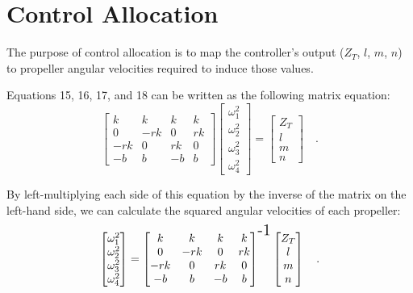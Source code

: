 \section*{Control Allocation}

The purpose of control allocation is to map the controller's output ($Z_T$, $l$, $m$, $n$) to propeller angular velocities required to induce those values.

Equations 15, 16, 17, and 18 can be written as the following matrix equation:
\begin{equation*}
    \begin{bmatrix}
        k & k & k & k \\ 
        0 & -rk & 0 & rk \\ 
        -rk & 0 & rk & 0 \\ 
        -b & b & -b & b
    \end{bmatrix}
    \begin{bmatrix}
        \omega_1^2 \\ 
        \omega_2^2 \\ 
        \omega_3^2 \\ 
        \omega_4^2
    \end{bmatrix}
    =
    \begin{bmatrix}
        Z_T \\ 
        l \\ 
        m \\ 
        n
    \end{bmatrix} \quad .
\end{equation*}

By left-multiplying each side of this equation by the inverse of the matrix on the left-hand side, we can calculate the squared angular velocities of each propeller:
\begin{equation}
    \begin{bmatrix}
        \omega_1^2 \\ 
        \omega_2^2 \\ 
        \omega_3^2 \\ 
        \omega_4^2
    \end{bmatrix}
    = 
    \begin{bmatrix}
        k & k & k & k \\ 
        0 & -rk & 0 & rk \\ 
        -rk & 0 & rk & 0 \\ 
        -b & b & -b & b
    \end{bmatrix}^{\text{\Large -1}}
    \begin{bmatrix}
        Z_T \\ 
        l \\ 
        m \\ 
        n
    \end{bmatrix} \quad .
\end{equation}

